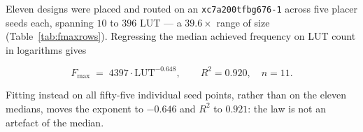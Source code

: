 Eleven designs were placed and routed on an \texttt{xc7a200tfbg676-1} across
five placer seeds each, spanning $10$ to $396$ LUT --- a $39.6\times$ range of
size (Table~\ref{tab:fmaxrows}). Regressing the median achieved frequency on LUT
count in logarithms gives

\begin{equation}
F_{\max} \;=\; 4397\cdot \mathrm{LUT}^{-0.648},\qquad R^2 = 0.920,\quad n=11 .
\label{eq:fmaxlaw}
\end{equation}

Fitting instead on all fifty-five individual seed points, rather than on the
eleven medians, moves the exponent to $-0.646$ and $R^2$ to $0.921$: the law is
not an artefact of the median.

\begin{table}[htbp]\centering\footnotesize 
{}
\caption{The eleven routed designs behind Equation~\ref{eq:fmaxlaw}, from
\texttt{measurements/\allowbreak decoder\_\allowbreak seed\_\allowbreak spread\_-08-19.json}. Five placer seeds
per design; the spread column is the seed-to-seed range of achieved frequency,
which reaches $20.5\%$ on one design.}
\label{tab:fmaxrows}
\end{table}

